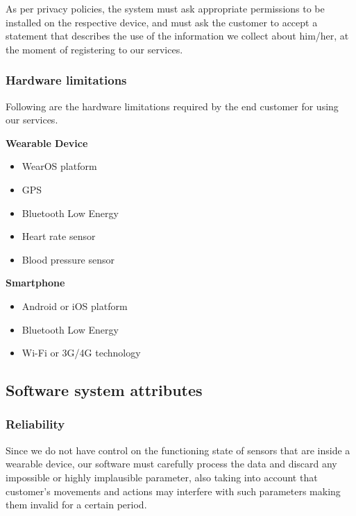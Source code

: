\documentclass[../main.tex]{subfiles}
\begin{document}
As per privacy policies, the system must ask appropriate permissions to be installed on the respective device, and must ask the customer to accept a statement that describes the use of the information we collect about him/her, at the moment of registering to our services.

\subsubsection{Hardware limitations}

Following are the hardware limitations required by the end customer for using our services.

\vspace*{8mm}
\begin{minipage}{\textwidth}
{\bf Wearable Device}
\begin{itemize}
	\item WearOS platform
	\item GPS
	\item Bluetooth Low Energy
	\item Heart rate sensor
	\item Blood pressure sensor
\end{itemize}
\end{minipage}

\vspace*{8mm}
\begin{minipage}{\textwidth}
{\bf Smartphone}
\begin{itemize}
	\item Android or iOS platform
	\item Bluetooth Low Energy
	\item Wi-Fi or 3G/4G technology
\end{itemize}
\end{minipage}

\subsection{Software system attributes}

\subsubsection{Reliability}

Since we do not have control on the functioning state of sensors that are inside a wearable device, our software must carefully process the data and discard any impossible or highly implausible parameter, also taking into account that customer's movements and actions may interfere with such parameters making them invalid for a certain period.
\end{document}

